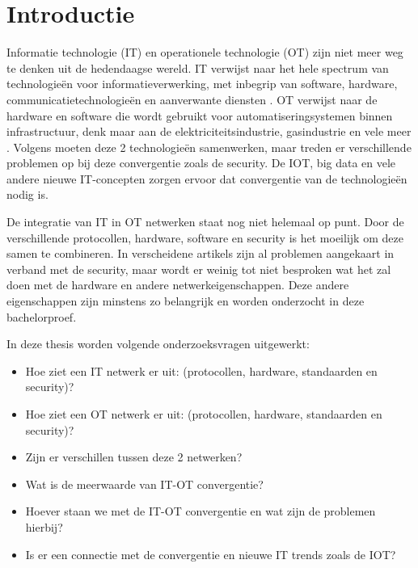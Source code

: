 
\section{Introductie} %
\label{sec:introductie}

Informatie technologie (IT) en operationele technologie (OT) zijn niet meer weg te denken uit de hedendaagse wereld. IT verwijst naar het hele spectrum van technologieën voor informatieverwerking, met inbegrip van software, hardware, communicatietechnologieën en aanverwante diensten  \autocite{SecureiconTeam2019}. OT verwijst naar de hardware en software die wordt gebruikt voor automatiseringsystemen binnen infrastructuur, denk maar aan de elektriciteitsindustrie, gasindustrie en vele meer \autocite{Murray}. Volgens \textcite{Hayes2020} moeten deze 2 technologieën samenwerken, maar treden er verschillende problemen op bij deze convergentie zoals de security. De IOT, big data en vele andere nieuwe IT-concepten zorgen ervoor dat convergentie van de technologieën nodig is.

De integratie van IT in OT netwerken staat nog niet helemaal op punt. Door de verschillende protocollen, hardware, software en security is het moeilijk om deze samen te combineren. In verscheidene artikels zijn al problemen aangekaart in verband met de security, maar wordt er weinig tot niet besproken wat het zal doen met de hardware en andere netwerkeigenschappen. Deze andere eigenschappen zijn minstens zo belangrijk en worden onderzocht in deze bachelorproef.

In deze thesis worden volgende onderzoeksvragen uitgewerkt:
\begin{itemize}
    \item Hoe ziet een IT netwerk er uit: (protocollen, hardware, standaarden en security)?
    \item Hoe ziet een OT netwerk er uit: (protocollen, hardware, standaarden en security)?
    \item Zijn er verschillen tussen deze 2 netwerken?
    \item Wat is de meerwaarde van IT-OT convergentie?
    \item Hoever staan we met de IT-OT convergentie en wat zijn de problemen hierbij?  
    \item Is er een connectie met de convergentie en nieuwe IT trends zoals de IOT?
    
\end{itemize}  

